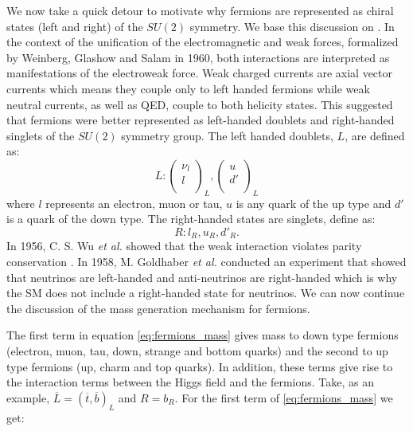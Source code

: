 We now take a quick detour to motivate why fermions are represented as chiral states (left and right) of the $SU(2)$ symmetry. We base this discussion on \cite{rute}. In the context of the unification of the electromagnetic and weak forces, formalized by Weinberg, Glashow and Salam in 1960, both interactions are interpreted as manifestations of the electroweak force. Weak charged currents are axial vector currents which means they couple only to left handed fermions while weak neutral currents, as well as QED, couple to both helicity states. This suggested that fermions were better represented as left-handed doublets and right-handed singlets of the $SU(2)$ symmetry group. The left handed doublets, $L$, are defined as:
\begin{equation}
L:\begin{pmatrix}
\nu_l \\
l \\
\end{pmatrix}_L,
\begin{pmatrix}
u \\
d' \\
\end{pmatrix}_L
\end{equation}
where $l$ represents an electron, muon or tau, $u$ is any quark of the up type and $d'$ is a quark of the down type. The right-handed states are singlets, define as:
\begin{equation}
	R: l_R,u_R,d'_R.
\end{equation} 
In 1956, C. S. Wu \textit{et al.} showed that the weak interaction violates parity conservation \cite{wu}. In 1958, M. Goldhaber \textit{et al.} conducted an experiment that showed that neutrinos are left-handed and anti-neutrinos are right-handed \cite{goldhaber} which is why the SM does not include a right-handed state for neutrinos. 
We can now continue the discussion of the mass generation mechanism for fermions.

The first term in equation \ref{eq:fermions_mass} gives mass to down type fermions (electron, muon, tau, down, strange and bottom quarks) and the second to up type fermions (up, charm and top quarks). In addition, these terms give rise to the interaction terms between the Higgs field and the fermions. Take, as an example, $\overline{L}=(\overline{t}, \overline{b})_L$ and $R=b_R$. For the first term of \ref{eq:fermions_mass} we get:

